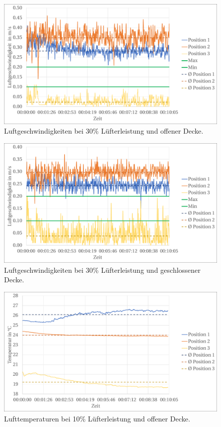 \begin{figure}[h!tb]
\centering
\includegraphics[scale=.45]{Pictures/30pctOC.pdf}
\caption{Luftgeschwindigkeiten bei 30\% Lüfterleistung und offener Decke.}
\label{fig:30pctOC}
\end{figure}


\begin{figure}[h!tb]
\centering
\includegraphics[scale=.45]{Pictures/30pctCC.pdf}
\caption{Luftgeschwindigkeiten bei 30\% Lüfterleistung und geschlossener Decke.}
\label{fig:30pctCC}
\end{figure}

\begin{figure}[h!tb]
\centering
\includegraphics[scale=.45]{Pictures/10pctOC_temp.pdf}
\caption{Lufttemperaturen bei 10\% Lüfterleistung und offener Decke.}
\label{fig:10pctOC_temp}
\end{figure}


